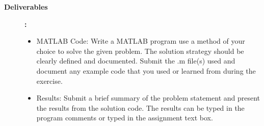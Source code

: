 \documentclass[11pt]{article}
\begin{document}
\begin{description}
\begin{enumerate}
  
\end{enumerate}


  \item [\textbf{ \large Deliverables}] \textbf{ \Large :}\\
    \begin{itemize} 
   
      \item MATLAB Code:
Write a MATLAB program use a method of your choice to solve the given problem. The solution strategy should be clearly defined and documented. Submit the .m file(s) used and document any example code that you used or learned from during the exercise.

      \item Results:
Submit a brief summary of the problem statement and present the results from the solution code. The results can be typed in the program comments or typed in the assignment text box.

    \end{itemize}
  \end{description}
 
\end{document}
